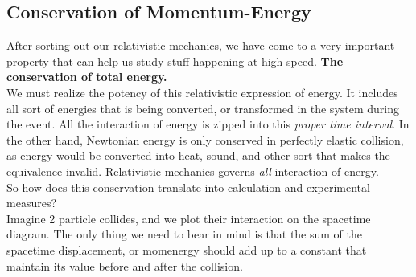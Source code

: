 \documentclass[12pt]{book}
\begin{document}
\subsection{Conservation of Momentum-Energy}
After sorting out our relativistic mechanics, we have come to a very important property that can help us study stuff happening at high speed. \textbf{The conservation of total energy.}\\
\newline
We must realize the potency of this relativistic expression of energy. It includes all sort of energies that is being converted, or transformed in the system during the event. All the interaction of energy is zipped into this \textit{proper time interval}. In the other hand, Newtonian energy is only conserved in perfectly elastic collision, as energy would be converted into heat, sound, and other sort that makes the equivalence invalid. Relativistic mechanics governs \textit{all} interaction of energy. \\
\newline
So how does this conservation translate into calculation and experimental measures?\\
\newline 
Imagine 2 particle collides, and we plot their interaction on the spacetime diagram. The only thing we need to bear in mind is that the sum of the spacetime displacement, or momenergy should add up to a constant that maintain its value before and after the collision. \\
\newpage
\end{document}
